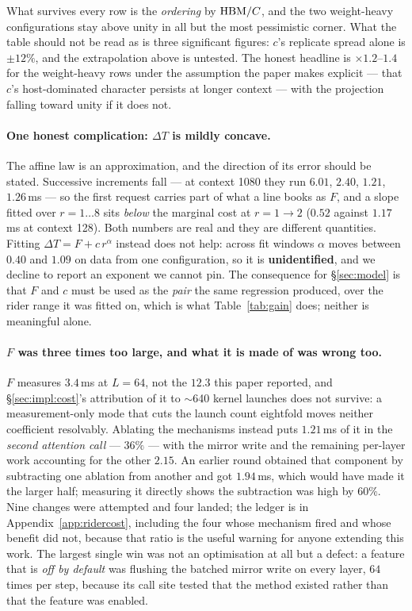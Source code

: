 What survives every row is the \emph{ordering} by $\mathrm{HBM}/C$, and the two
weight-heavy configurations stay above unity in all but the most pessimistic corner.
What the table should not be read as is three significant figures: $c$'s replicate
spread alone is $\pm 12\%$, and the extrapolation above is untested. The honest
headline is $\times 1.2$--$1.4$ for the weight-heavy rows under the assumption the
paper makes explicit --- that $c$'s host-dominated character persists at longer
context --- with the projection falling toward unity if it does not.

\paragraph{One honest complication: $\Delta T$ is mildly concave.}
The affine law is an approximation, and the direction of its error should be stated.
Successive increments fall --- at context 1080 they run $6.01$, $2.40$, $1.21$,
$1.26$\,ms --- so the first request carries part of what a line books as $F$, and a
slope fitted over $r = 1\ldots8$ sits \emph{below} the marginal cost at
$r = 1 \to 2$ ($0.52$ against $1.17$\,ms at context 128). Both numbers are real and
they are different quantities. Fitting $\Delta T = F + c\,r^{\alpha}$ instead does
not help: across fit windows $\alpha$ moves between $0.40$ and $1.09$ on data from
one configuration, so it is \textbf{unidentified}, and we decline to report an
exponent we cannot pin. The consequence for \S\ref{sec:model} is that $F$ and $c$
must be used as the \emph{pair} the same regression produced, over the rider range
it was fitted on, which is what Table~\ref{tab:gain} does; neither is meaningful
alone.

\paragraph{$F$ was three times too large, and what it is made of was wrong too.}
$F$ measures $3.4$\,ms at $L = 64$, not the $12.3$ this paper reported, and
\S\ref{sec:impl:cost}'s attribution of it to $\sim$640 kernel launches does not
survive: a measurement-only mode that cuts the launch count eightfold moves neither
coefficient resolvably. Ablating the mechanisms instead puts $1.21$\,ms of it in
the \emph{second attention call} --- $36\%$ --- with the mirror write and the
remaining per-layer work accounting for the other $2.15$. An earlier round obtained
that component by subtracting one ablation from another and got $1.94$\,ms, which
would have made it the larger half; measuring it directly shows the subtraction was
high by $60\%$. Nine changes were attempted and four
landed; the ledger is in Appendix~\ref{app:ridercost}, including the four whose
mechanism fired and whose benefit did not, because that ratio is the useful warning
for anyone extending this work. The largest single win was not an optimisation at
all but a defect: a feature that is \emph{off by default} was flushing the batched
mirror write on every layer, $64$ times per step, because its call site tested that
the method existed rather than that the feature was enabled.

